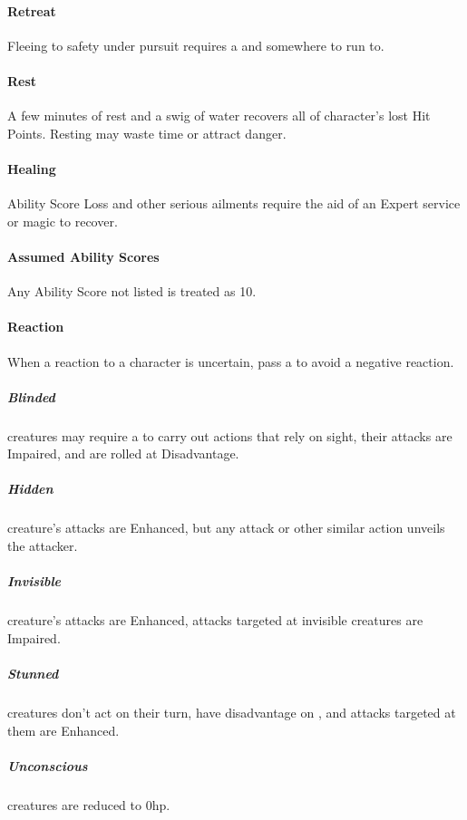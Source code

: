 \documentclass[itdr]{subfiles}
\begin{document}
\paragraph{Retreat}
Fleeing to safety under pursuit requires a  and somewhere to run to.

\paragraph{Rest}
A few minutes of rest and a swig of water recovers all of character's lost Hit Points. Resting may waste time or attract danger.

\paragraph{Healing}
Ability Score Loss and other serious ailments require the aid of an Expert service or magic to recover.

\paragraph{Assumed Ability Scores}
Any Ability Score not listed is treated as 10.

\paragraph{Reaction}
When a reaction to a character is uncertain, pass a  to avoid a negative reaction.


\subparagraph{Blinded} creatures may require a  to carry out actions that rely on sight, their attacks are Impaired, and  are rolled at Disadvantage.

\subparagraph{Hidden} creature's attacks are Enhanced, but any attack or other similar action unveils the attacker.

\subparagraph{Invisible} creature's attacks are Enhanced, attacks targeted at invisible creatures are Impaired.

\subparagraph{Stunned} creatures don't act on their turn, have disadvantage on , and attacks targeted at them are Enhanced.

\subparagraph{Unconscious} creatures are reduced to 0hp.
\end{document}
